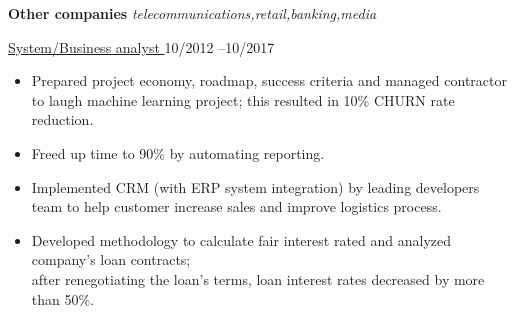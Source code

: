 \textbf{Other companies} \textit{telecommunications,retail,banking,media} \par
\underline{System/Business analyst } \hfill 10/2012 --10/2017
\begin{itemize}
	\item Prepared  project economy, roadmap, success criteria and managed contractor to laugh machine learning project; this resulted in 10\% CHURN rate reduction.
 	\item 	Freed up time to 90\% by automating reporting.
 	\item Implemented CRM (with ERP system integration) by leading developers team to help customer increase sales and improve logistics process.
        \item Developed methodology to calculate fair interest rated and analyzed company's loan contracts; \\after renegotiating the loan's terms, loan interest rates decreased by more than 50\%.
\end{itemize}\par
